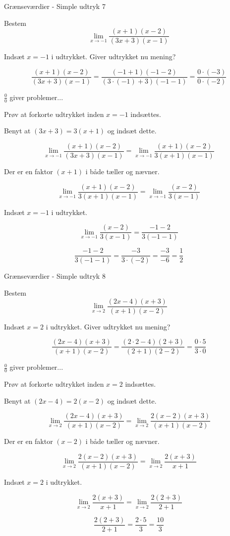 \documentclass{article}
\begin{document}
\newpage
\begin{exercise}{Grænseværdier - Simple udtryk 7}

Bestem
\[
\lim_{x \to -1} \frac{(x + 1)(x - 2)}{(3x + 3)(x - 1)}
\]


\hint
Indsæt $x=-1$ i udtrykket. Giver udtrykket nu mening?

\hint
\[
\frac{(x + 1)(x - 2)}{(3x + 3)(x - 1)} = \frac{(-1 + 1)(-1 - 2)}{(3 \cdot (-1)+3)(-1 - 1)} = \frac{0 \cdot (-3)}{0 \cdot (-2)}
\]

\hint
$\frac{0}{0}$ giver problemer...

\hint
Prøv at forkorte udtrykket inden $x=-1$ indsættes.

\hint
Benyt at $(3x + 3) = 3 (x + 1)$ og indsæt dette.

\hint
\[
\lim_{x \to -1} \frac{(x + 1)(x - 2)}{(3x + 3)(x - 1)} = \lim_{x \to -1} \frac{(x + 1)(x - 2)}{3(x + 1)(x - 1)}
\]

\hint
Der er en faktor $(x + 1)$ i både tæller og nævner.

\hint
\[
\lim_{x \to -1} \frac{(x + 1)(x - 2)}{3(x + 1)(x - 1)} = \lim_{x \to -1} \frac{(x - 2)}{3(x - 1)}
\]

\hint
Indsæt $x=-1$ i udtrykket.

\hint
\[
\lim_{x \to -1} \frac{(x - 2)}{3(x - 1)} = \frac{-1 - 2}{3(-1 - 1)}
\]

\hint
\[
\frac{-1 - 2}{3(-1 - 1)} = \frac{-3}{3\cdot (-2)} = \frac{-3}{-6} = \frac{1}{2}
\]


\end{exercise}

\newpage
\begin{exercise}{Grænseværdier - Simple udtryk 8}

Bestem
\[
\lim_{x \to 2} \frac{(2x - 4)(x + 3)}{(x + 1)(x - 2)}
\]


\hint
Indsæt $x=2$ i udtrykket. Giver udtrykket nu mening?

\hint
\[
\frac{(2x - 4)(x + 3)}{(x + 1)(x - 2)} = \frac{(2 \cdot 2 - 4)(2 + 3)}{(2 + 1)(2 - 2)} = \frac{0 \cdot 5}{3 \cdot 0}
\]

\hint
$\frac{0}{0}$ giver problemer...

\hint
Prøv at forkorte udtrykket inden $x=2$ indsættes.

\hint
Benyt at $(2x - 4) = 2 (x - 2)$ og indsæt dette.

\hint
\[
\lim_{x \to 2} \frac{(2x - 4)(x + 3)}{(x + 1)(x - 2)} = \lim_{x \to 2} \frac{2(x - 2)(x + 3)}{(x + 1)(x - 2)}
\]


\hint
Der er en faktor $(x - 2)$ i både tæller og nævner.

\hint
\[
\lim_{x \to 2} \frac{2(x - 2)(x + 3)}{(x + 1)(x - 2)} = \lim_{x \to 2} \frac{2(x + 3)}{x + 1}
\]

\hint
Indsæt $x=2$ i udtrykket.

\hint
\[
\lim_{x \to 2} \frac{2(x + 3)}{x + 1} = \lim_{x \to 2} \frac{2(2 + 3)}{2 + 1}
\]

\hint
\[
\frac{2(2 + 3)}{2 + 1} = \frac{2 \cdot 5}{3} = \frac{10}{3}
\]


\end{exercise}

\newpage
\end{document}

